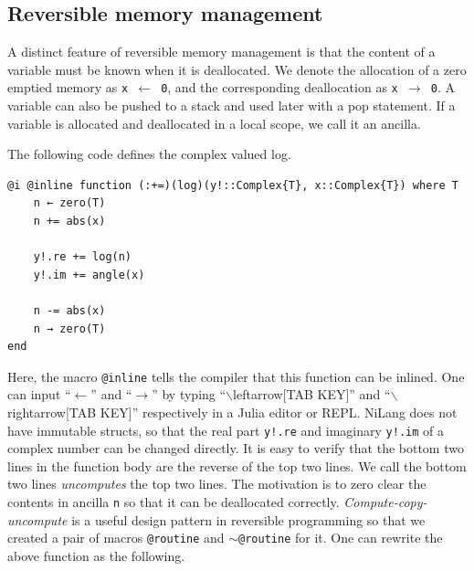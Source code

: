 \documentclass{article}
\newcommand{\<}{\langle}
\renewcommand{\>}{\rangle}
\theoremstyle{definition}\newtheorem{definition}{\textit{Definition}}
\begin{document}
\subsection{Reversible memory management}
    A distinct feature of reversible memory management is that the content of a variable must be known when it is deallocated.
    We denote the allocation of a zero emptied memory as \texttt{x $\leftarrow$ 0}, and the corresponding deallocation as \texttt{x $\rightarrow$ 0}.
    A variable can also be pushed to a stack and used later with a pop statement.
    If a variable is allocated and deallocated in a local scope, we call it an ancilla.

The following code defines the complex valued log.

\begin{minipage}{.88\columnwidth}
\begin{lstlisting}[mathescape=true,caption={Reversible complex valued log function $y\mathrel{+}=\log(|x|) + i{\rm Arg}(x)$.},label={lst:complex}]
@i @inline function (:+=)(log)(y!::Complex{T}, x::Complex{T}) where T
    n ← zero(T)
    n += abs(x)

    y!.re += log(n)
    y!.im += angle(x)

    n -= abs(x)
    n → zero(T)
end
\end{lstlisting}
\end{minipage}

Here, the macro \texttt{@inline} tells the compiler that this function can be inlined. One can input ``$\leftarrow$'' and ``$\rightarrow$'' by typing ``$\backslash$leftarrow[TAB KEY]'' and ``$\backslash$rightarrow[TAB KEY]'' respectively in a Julia editor or REPL.
NiLang does not have immutable structs, so that the real part \texttt{y!.re} and imaginary \texttt{y!.im} of a complex number can be changed directly.
It is easy to verify that the bottom two lines in the function body are the reverse of the top two lines. We call the bottom two lines \textit{uncomputes} the top two lines.
The motivation is to zero clear the contents in ancilla \texttt{n} so that it can be deallocated correctly.
\textit{Compute-copy-uncompute} is a useful design pattern in reversible programming so that we created a pair of macros \texttt{@routine} and \texttt{$\sim$@routine} for it. One can rewrite the above function as the following.
\end{document}

